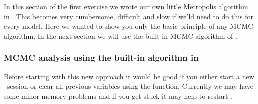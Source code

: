 In this section of the first exercise we wrote our own little Metropolis algorithm in \Rev.
This becomes very cumbersome, difficult and slow if we'ld need to do this for every model.
Here we wanted to show you only the basic principle of any MCMC algorithm.
In the next section we will use the built-in MCMC algorithm of \RevBayes.




\subsubsection{MCMC analysis using the built-in algorithm in \RevBayes}
Before starting with this new approach it would be good if you either start a new \RevBayes~session or clear all previous variables using the  function.
Currently we may have some minor memory problems and if you get stuck it may help to restart \RevBayes.

